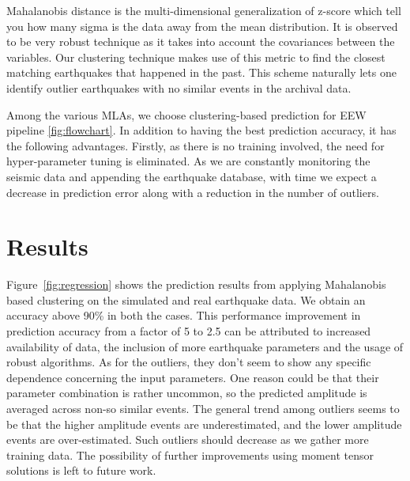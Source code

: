 \documentclass[twocolumn, aps, superscriptaddress]{revtex4}
\begin{document}
Mahalanobis distance is the multi-dimensional generalization of z-score which tell you how many sigma is the data away from the mean distribution. It is observed to be very robust technique as it takes into account the covariances between the variables. Our clustering technique makes use of this metric to find the closest matching earthquakes that happened in the past. This scheme naturally lets one identify outlier earthquakes with no similar events in the archival data.

Among the various MLAs, we choose clustering-based prediction for EEW pipeline \ref{fig:flowchart}. In addition to having the best prediction accuracy, it has the following advantages.  Firstly, as there is no training involved, the need for hyper-parameter tuning is eliminated. As we are constantly monitoring the seismic data and appending the earthquake database, with time we expect a decrease in prediction error along with a reduction in the number of outliers. 


\section{Results}\label{sec:results}

Figure~\ref{fig:regression} shows the prediction results from applying Mahalanobis based clustering on the simulated and real earthquake data. We obtain an accuracy above 90\% in both the cases. This performance improvement in prediction accuracy from a factor of 5 to 2.5 can be attributed to increased availability of data, the inclusion of more earthquake parameters and the usage of robust algorithms.  As for the outliers, they don't seem to show any specific dependence concerning the input parameters. One reason could be that their parameter combination is rather uncommon, so the predicted amplitude is averaged across non-so similar events. The general trend among outliers seems to be that the higher amplitude events are underestimated, and the lower amplitude events are over-estimated. Such outliers should decrease as we gather more training data. The possibility of further improvements using moment tensor solutions is left to future work.
\end{document}
